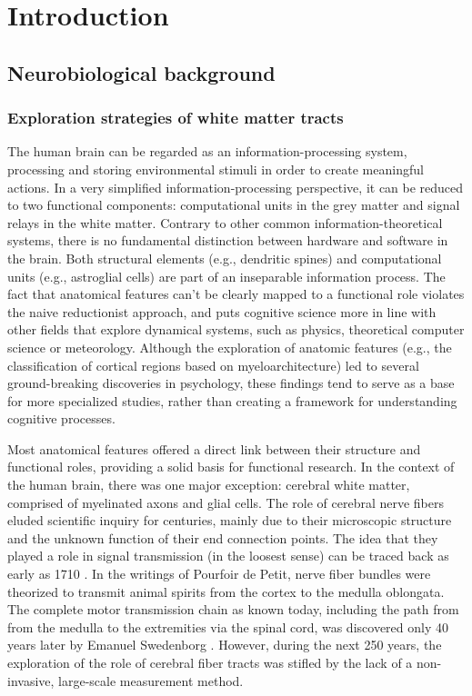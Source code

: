 
\chapter{Introduction}

\section{Neurobiological background}
\subsection{Exploration strategies of white matter tracts}
The human brain can be regarded as an information-processing system, processing and storing environmental stimuli in order to create meaningful actions. 
In a very simplified information-processing perspective, it can be reduced to two functional components: computational units in the grey matter and signal relays in the white matter.
Contrary to other common information-theoretical systems, there is no fundamental distinction between hardware and software in the brain.
Both structural elements (e.g., dendritic spines) and computational units (e.g., astroglial cells) are part of an inseparable information process.
The fact that anatomical features can't be clearly mapped to a functional role violates the naive reductionist approach, and puts cognitive science more in line with other fields that explore dynamical systems, such as physics, theoretical computer science or meteorology.
Although the exploration of anatomic features (e.g., the classification of cortical regions based on myeloarchitecture) led to several ground-breaking discoveries in psychology, these findings tend to serve as a base for more specialized studies, rather than creating a framework for understanding cognitive processes.

Most anatomical features offered a direct link between their structure and functional roles, providing a solid basis for functional research.
In the context of the human brain, there was one major exception: cerebral white matter, comprised of myelinated axons and glial cells.
The role of cerebral nerve fibers eluded scientific inquiry for centuries, mainly due to their microscopic structure and the unknown function of their end connection points.
The idea that they played a role in signal transmission (in the loosest sense) can be traced back as early as 1710 \cite{1.1.history}.
In the writings of Pourfoir de Petit, nerve fiber bundles were theorized to transmit animal spirits from the cortex to the medulla oblongata.
The complete motor transmission chain as known today, including the path from from the medulla to the extremities via the spinal cord, was discovered only 40 years later by Emanuel Swedenborg \cite{1.1.history}.
However, during the next 250 years, the exploration of the role of cerebral fiber tracts was stifled by the lack of a non-invasive, large-scale measurement method.

